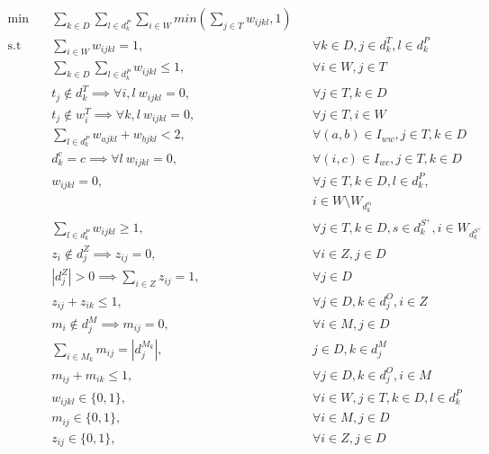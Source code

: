\documentclass[../thesis.tex]{subfiles}
\begin{document}
\begin{align}
    \textrm{min} \quad & \sum_{k \in D} \sum_{l \in d^P_k} \sum_{i \in W} min(\sum_{j \in T} w_{ijkl}, 1) & \label{obj} \\ 
    \textrm{s.t} \quad & \sum_{i \in W} w_{ijkl} = 1, && \forall k \in D, j \in d_k^T, l \in d_k^P \label{wc1} \\
    & \sum_{k \in D} \sum_{l \in d_k^P} w_{ijkl} \leq 1, && \forall i \in W, j \in T \label{wc2} \\
    & t_j \notin d^T_{k} \implies \forall i, l \ w_{ijkl} = 0,  & &\forall j \in T , k \in D \label{wc3} \\
    & t_j \notin w^T_{i} \implies \forall k, l \ w_{ijkl} = 0, && \forall j \in T, i \in W \label{wc4} \\ 
    & \sum_{l \in d^P_k} w_{ajkl} + w_{bjkl} < 2, &&  \forall {(a, b) \in I_{ww}}, j \in T, k \in D \label{wc5} \\
    & d^c_{k} = c \implies \forall l \ w_{ijkl} = 0, && \forall {(i, c) \in I_{wc}}, j \in T, k \in D \label{wc6} \\ 
    & w_{ijkl} = 0, && \forall j \in T, k \in D, l \in d^P_k, \label{wc7} \\
    & && i \in W \setminus W_{d^{s_l}_k} \nonumber\\
    & \sum_{l \in d_k^P} w_{ijkl} \geq 1, && \forall j \in T, k \in D, s \in d^{S^+}_k, i \in W_{d^{S^+}_k} \label{wc8} \\ 
    & z_i \notin d^Z_j \implies z_{ij} = 0, && \forall i \in Z, j \in D \label{zc1}  \\
    & |d^Z_j| > 0 \implies \sum_{i \in Z} z_{ij} = 1, && \forall j \in D \label{zc2} \\
    & z_{ij} + z_{ik} \leq 1, && \forall j \in D, k \in d^O_j, i \in Z \label{zc3} \\
    & m_i \notin d^M_j \implies m_{ij} = 0, && \forall i \in M, j \in D  \label{mc1} \\
    & \sum_{i \in M_k} m_{ij} = |d^{M_k}_j|, && j \in D, k \in d^M_j  \label{mc2} \\
    & m_{ij} + m_{ik} \leq 1, && \forall j \in D, k \in d^O_j, i \in M  \label{mc3} \\
    & w_{ijkl} \in \{0, 1\}, && \forall i \in W, j \in T, k \in D, l \in d^P_k \label{binary1} \\
    & m_{ij} \in \{0, 1\}, && \forall i \in M, j \in D \label{binary2} \\ 
    & z_{ij} \in \{0, 1\}, && \forall i \in Z, j \in D \label{binary3}
\end{align}
    
\end{document}
